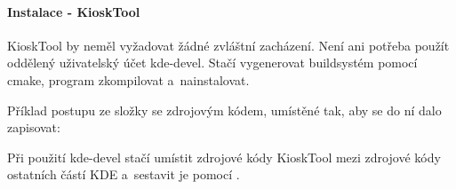 \paragraph{Instalace - KioskTool}
KioskTool by neměl vyžadovat žádné zvláštní zacházení. Není ani potřeba použít oddělený uživatelský účet kde-devel. Stačí vygenerovat buildsystém pomocí cmake, program zkompilovat a~nainstalovat.

Příklad postupu ze složky se zdrojovým kódem, umístěné tak, aby se do ní dalo zapisovat:

\noindent
{}

\noindent
{}

\noindent
{}

\noindent
{}

Při použití kde-devel stačí umístit zdrojové kódy KioskTool mezi zdrojové kódy ostatních částí KDE a~sestavit je pomocí .